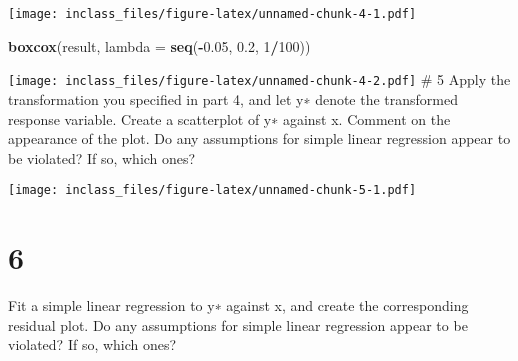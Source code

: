 \documentclass[]{article}
\newenvironment{Shaded}{\begin{snugshade}}{\end{snugshade}}
\newcommand{\KeywordTok}[1]{\textcolor[rgb]{0.13,0.29,0.53}{\textbf{#1}}}
\newcommand{\DataTypeTok}[1]{\textcolor[rgb]{0.13,0.29,0.53}{#1}}
\newcommand{\DecValTok}[1]{\textcolor[rgb]{0.00,0.00,0.81}{#1}}
\newcommand{\FloatTok}[1]{\textcolor[rgb]{0.00,0.00,0.81}{#1}}
\newcommand{\StringTok}[1]{\textcolor[rgb]{0.31,0.60,0.02}{#1}}
\newcommand{\OperatorTok}[1]{\textcolor[rgb]{0.81,0.36,0.00}{\textbf{#1}}}
\newcommand{\NormalTok}[1]{#1}
\begin{document}
\texttt{[image: inclass\_files/figure-latex/unnamed-chunk-4-1.pdf]}

\begin{Shaded}
\begin{Highlighting}[]
\KeywordTok{boxcox}\NormalTok{(result, }\DataTypeTok{lambda =} \KeywordTok{seq}\NormalTok{(}\OperatorTok{-}\FloatTok{0.05}\NormalTok{, }\FloatTok{0.2}\NormalTok{, }\DecValTok{1}\OperatorTok{/}\DecValTok{100}\NormalTok{))}
\end{Highlighting}
\end{Shaded}

\texttt{[image: inclass\_files/figure-latex/unnamed-chunk-4-2.pdf]} \# 5
Apply the transformation you specified in part 4, and let y∗ denote the
transformed response variable. Create a scatterplot of y∗ against x.
Comment on the appearance of the plot. Do any assumptions for simple
linear regression appear to be violated? If so, which ones?

\begin{Shaded}
\end{Shaded}

\texttt{[image: inclass\_files/figure-latex/unnamed-chunk-5-1.pdf]}

\section{6}\label{section-3}

Fit a simple linear regression to y∗ against x, and create the
corresponding residual plot. Do any assumptions for simple linear
regression appear to be violated? If so, which ones?

\begin{Shaded}
\end{Shaded}
\end{document}
